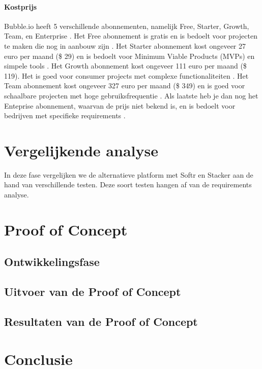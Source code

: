 \paragraph{Kostprijs}
Bubble.io heeft 5 verschillende abonnementen, namelijk Free, Starter, Growth, Team, en Enterprise \autocite{Bubble2024}.
Het Free abonnement is gratis en is bedoelt voor projecten te maken die nog in aanbouw zijn \autocite{Bubble2024}.
Het Starter abonnement kost ongeveer 27 euro per maand (\$ 29) en is bedoelt voor Minimum Viable Products (MVPs) en simpele tools \autocite{Bubble2024}.
Het Growth abonnement kost ongeveer 111 euro per maand (\$ 119). Het is goed voor consumer projects met complexe functionaliteiten \autocite{Bubble2024}.
Het Team abonnement kost ongeveer 327 euro per maand (\$ 349) en is goed voor schaalbare projecten met hoge gebruiksfrequentie \autocite{Bubble2024}. Als laatste heb je dan nog
het Enteprise abonnement, waarvan de prijs niet bekend is, en is bedoelt voor bedrijven met specifieke requirements \autocite{Bubble2024}.


\section*{Vergelijkende analyse}
\label{sec:vergelijkende-analyse}
In deze fase vergelijken we de alternatieve platform met Softr en Stacker aan de hand van verschillende testen. 
Deze soort testen hangen af van de requirements analyse.


\section*{Proof of Concept}
\label{sec:proof-of-concept}
\subsection*{Ontwikkelingsfase}
\subsection*{Uitvoer van de Proof of Concept}
\subsection*{Resultaten van de Proof of Concept}

\section*{Conclusie}

